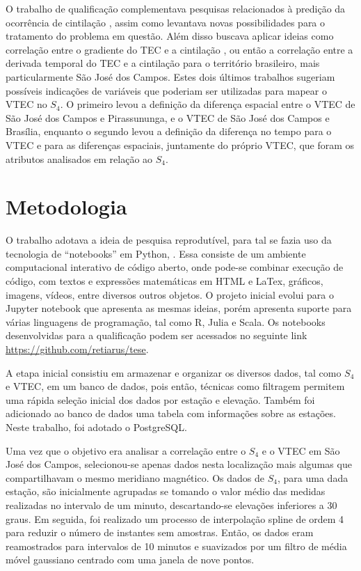 O trabalho de qualificação complementava pesquisas relacionados à predição da ocorrência de cintilação \cite{REZENDE:2009, GLAUSTON:2014, GLAUSTON:2015}, assim como levantava novas possibilidades para o tratamento do problema em questão. Além disso buscava aplicar ideias como correlação entre o gradiente do TEC e a cintilação \cite{RAGHAVARAO:1998, RAY:2006}, ou então a correlação entre a derivada temporal do TEC e a cintilação \cite{RAGHUNATH:2016} para o território brasileiro, mais particularmente São José dos Campos. Estes dois últimos trabalhos sugeriam possíveis indicações de variáveis que poderiam ser utilizadas para mapear o VTEC no $S_4$. O primeiro levou a definição da diferença espacial entre o VTEC de São José dos Campos e Pirassununga, e o VTEC de São José dos Campos e Brasília, enquanto o segundo levou a definição da diferença no tempo para o VTEC e para as diferenças espaciais, juntamente do próprio VTEC, que foram os atributos analisados em relação ao $S_4$.

\section{Metodologia}

O trabalho adotava a ideia de pesquisa reprodutível, para tal se fazia uso da tecnologia de ``notebooks'' em Python, \cite{PEREZ:2007}. Essa consiste de um ambiente computacional interativo de código aberto, onde pode-se combinar execução de código, com textos e expressões matemáticas em HTML e LaTex, gráficos, imagens, vídeos, entre diversos outros objetos. O projeto inicial evolui para o Jupyter notebook que apresenta as mesmas ideias, porém apresenta suporte para várias linguagens de programação, tal como R, Julia e Scala. Os notebooks desenvolvidas para a qualificação podem ser acessados no seguinte link \url{https://github.com/retiarus/tese}.

A etapa inicial consistiu em armazenar e organizar os diversos dados, tal como $S_4$ e VTEC, em um banco de dados, pois então, técnicas como filtragem permitem uma rápida seleção inicial dos dados por estação e elevação. Também foi adicionado ao banco de dados uma tabela com informações sobre as estações. Neste trabalho, foi adotado o PostgreSQL.

Uma vez que o objetivo era analisar a correlação entre o $S_4$ e o VTEC em São José dos Campos, selecionou-se apenas dados nesta localização mais algumas que compartilhavam o mesmo meridiano magnético. Os dados de $S_4$, para uma dada estação, são inicialmente agrupadas se tomando o valor médio das medidas realizadas no intervalo de um minuto, descartando-se elevações inferiores a 30 graus. Em seguida, foi realizado um processo de interpolação spline de ordem 4 para reduzir o número de instantes sem amostras. Então, os dados eram reamostrados para intervalos de 10 minutos e suavizados por um filtro de média móvel gaussiano centrado com uma janela de nove pontos.

